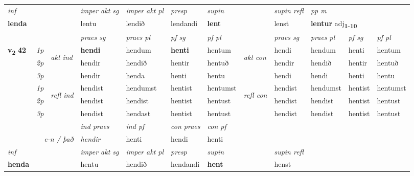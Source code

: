 \begin{longtable}[l]{X>{\footnotesize\itshape}llXXXXlXXXX}
\cmidrule{4-7}
   {\textit{inf}} & &  & \textit{imper akt sg} & \textit{imper akt pl}   & \textit{presp} & \textit{supin} && \textit{supin refl} & \textit{pp m} \\*
  {\textbf{lenda}} & && lentu  & lendið   & lendandi &  \textbf{lent} && lenst & \multicolumn{2}{l}{\textbf{lentur} adj\textbf{\textsubscript{1-10}}} \\*

\midrule

 & &   & \textit{praes sg}  & \textit{praes pl}    & \textit{ pf sg} & \textit{pf pl} & & \textit{praes sg}  & \textit{praes pl}    & \textit{pf sg} & \textit{pf pl }  \\ \cmidrule{4-7} \cmidrule{9-12}
 \multirow{2}{*}{{{\textbf{v{\textsubscript{2}}} \Large{\textbf{42}}}}}  & 1p & \multirow{3}{*}{\begin{turn}{90}\textit{akt ind}\end{turn}} & \textbf{hendi} & hendum & \textbf{henti} & hentum & \multirow{3}{*}{\begin{turn}{90}\textit{akt con}\end{turn}} &hendi & hendum & henti & hentum\\*
 & 2p &  &  hendir  & hendið & hentir & hentuð & & hendir & hendið & hentir & hentuð \\*
 & 3p &  & hendir & henda & henti & hentu & & hendi & hendi& henti & hentu \\*
\cmidrule{4-7} \cmidrule{9-12}
 & 1p & \multirow{3}{*}{\begin{turn}{90}\textit{refl ind}\end{turn}}  & hendist & hendumst & hentist & hentumst & \multirow{3}{*}{\begin{turn}{90}\textit{refl con}\end{turn}}  &hendist & hendumst & hentist & hentumst \\*
 & 2p &  & hendist & hendist & hentist & hentust & &hendist & hendist & hentist & hentust \\*
 & 3p  & & hendist & hendast & hentist & hentust & & hendist & hendist& hentist & hentust \\*
\cmidrule{4-7} \cmidrule{9-12}

   && &  \textit{ind praes} & \textit{ind pf} & \textit{con praes} & \textit{con pf} \\*
\multicolumn{3}{r}{\textit{e-n / það}} & hendir & henti & hendi & henti \\*

\cmidrule{4-7}
   {\textit{inf}} & &  & \textit{imper akt sg} & \textit{imper akt pl}   & \textit{presp} & \textit{supin} && \textit{supin refl}  \\*
  {\textbf{henda}} & && hentu  & hendið   & hendandi &  \textbf{hent} && henst  \\*


\end{longtable}
